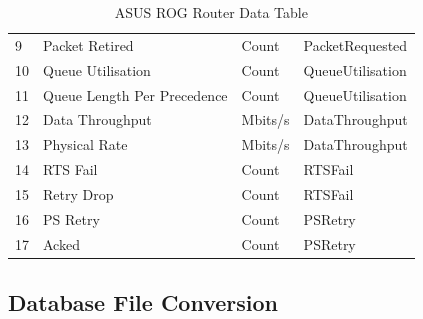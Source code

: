 \begin{table}[h]
\begin{tabular}{:l:l:l:l:}
9                                         & Packet Retired                           & Count                               & PacketRequested                           \\
10                                        & Queue Utilisation~                       & Count                               & QueueUtilisation                          \\
11                                        & Queue Length Per Precedence              & Count                               & QueueUtilisation                          \\
12                                        & Data Throughput~                         & Mbits/s                             & DataThroughput                            \\
13                                        & Physical Rate~                           & Mbits/s                             & DataThroughput                            \\
14                                        & RTS Fail~                                & Count                               & RTSFail                                   \\
15                                        & Retry Drop~                              & Count                               & RTSFail                                   \\
16                                        & PS Retry                                 & Count                               & PSRetry                                   \\
17                                        & Acked                                    & Count                               & PSRetry                                   \\
\end{tabular}
\caption{ASUS ROG Router Data Table\\}
\label{table:GUIData}
\end{table}

\subsection{Database File Conversion}
\label{Section: Database File Conversion}

